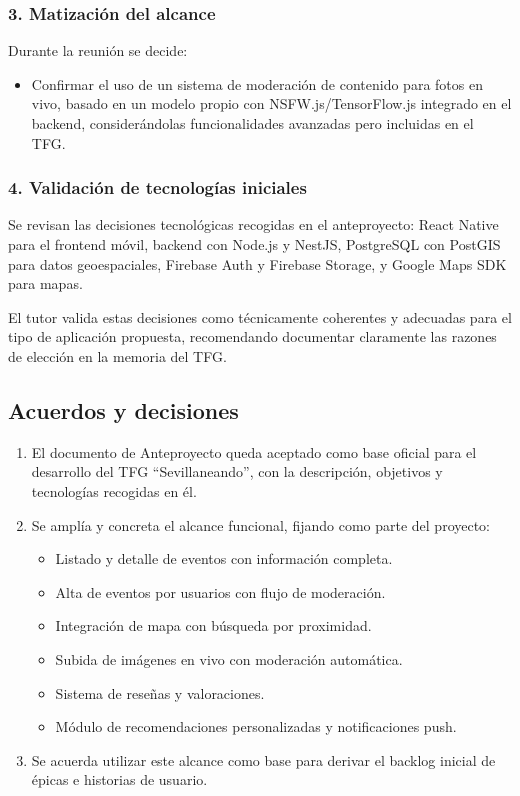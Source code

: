 \subsubsection*{3. Matización del alcance}
Durante la reunión se decide:

\begin{itemize}
    \item Confirmar el uso de un sistema de moderación de contenido para fotos en vivo, basado en un modelo propio con NSFW.js/TensorFlow.js integrado en el backend, considerándolas funcionalidades avanzadas pero incluidas en el TFG.
\end{itemize}

\subsubsection*{4. Validación de tecnologías iniciales}
Se revisan las decisiones tecnológicas recogidas en el anteproyecto: React Native para el frontend móvil, backend con Node.js y NestJS, PostgreSQL con PostGIS para datos geoespaciales, Firebase Auth y Firebase Storage, y Google Maps SDK para mapas.

El tutor valida estas decisiones como técnicamente coherentes y adecuadas para el tipo de aplicación propuesta, recomendando documentar claramente las razones de elección en la memoria del TFG.

\subsection*{Acuerdos y decisiones}
\begin{enumerate}
    \item El documento de Anteproyecto queda aceptado como base oficial para el desarrollo del TFG ``Sevillaneando'', con la descripción, objetivos y tecnologías recogidas en él.
    \item Se amplía y concreta el alcance funcional, fijando como parte del proyecto:
    \begin{itemize}
        \item Listado y detalle de eventos con información completa.
        \item Alta de eventos por usuarios con flujo de moderación.
        \item Integración de mapa con búsqueda por proximidad.
        \item Subida de imágenes en vivo con moderación automática.
        \item Sistema de reseñas y valoraciones.
        \item Módulo de recomendaciones personalizadas y notificaciones push.
    \end{itemize}
    \item Se acuerda utilizar este alcance como base para derivar el backlog inicial de épicas e historias de usuario.
\end{enumerate}

